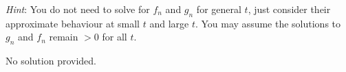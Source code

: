 \documentclass[a4paper, 12pt]{article}
\begin{document}
\begin{enumerate}[label={\bf \arabic{*}.\;}, ref={\arabic{*}},itemsep=3ex, left=0ex]
{\begin{enumerate}[label=(\alph*)]
{            \emph{Hint}: You do not need to solve for $f_n$ and $g_n$ for general $t$, just consider their approximate behaviour at small $t$ and large $t$. You may assume the solutions to $g_n$ and $f_n$ remain $>0$ for all $t$.

          }
      \end{enumerate}
    }
    {
      No solution provided.
    }

\end{enumerate}
\end{document}
